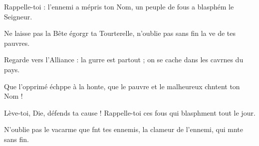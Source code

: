 \item Rappelle-toi : l’ennemi a mépris ton Nom,\psstar{} un peuple de fous a blasphém le Seigneur.
\item Ne laisse pas la Bête égorgr ta Tourterelle,\psstar{} n’oublie pas sans fin la ve de tes pauvres.
\item Regarde vers l’Alliance : la gurre est partout ;\psstar{} on se cache dans les cavrnes du pays.
\item Que l’opprimé échppe à la honte,\psstar{} que le pauvre et le malheureux chntent ton Nom !
\item Lève-toi, Die, défends ta cause !\psstar{} Rappelle-toi ces fous qui blasphment tout le jour.
\item N’oublie pas le vacarme que fnt tes ennemis,\psstar{} la clameur de l’ennemi, qui mnte sans fin.